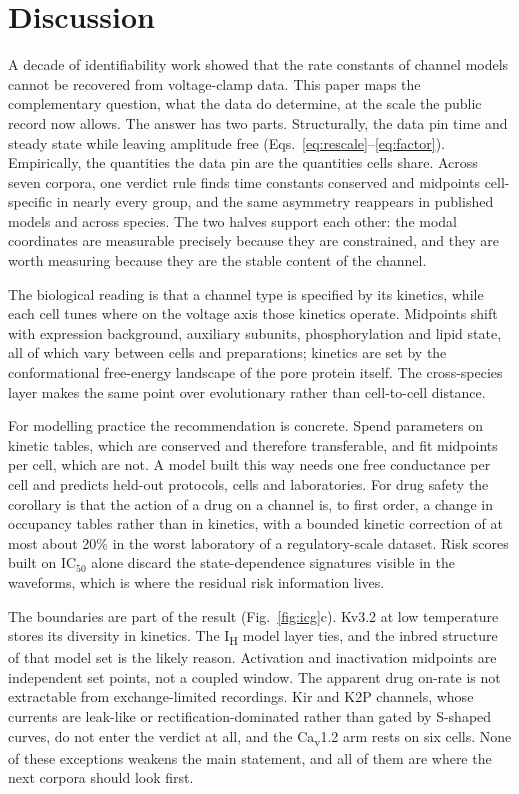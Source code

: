 \documentclass[11pt,a4paper]{article}
\begin{document}
\section{Discussion}

A decade of identifiability work showed that the rate constants of channel models
cannot be recovered from voltage-clamp data. This paper maps the complementary
question, what the data do determine, at the scale the public record now allows.
The answer has two parts. Structurally, the data pin time and steady state while
leaving amplitude free (Eqs.~\eqref{eq:rescale}--\eqref{eq:factor}).
Empirically, the quantities the data pin are the quantities cells share. Across
seven corpora, one verdict rule finds time constants conserved and midpoints
cell-specific in nearly every group, and the same asymmetry reappears in
published models and across species. The two halves support each other: the
modal coordinates are measurable precisely because they are constrained, and they
are worth measuring because they are the stable content of the channel.

The biological reading is that a channel type is specified by its kinetics, while
each cell tunes where on the voltage axis those kinetics operate. Midpoints shift
with expression background, auxiliary subunits, phosphorylation and lipid state,
all of which vary between cells and preparations; kinetics are set by the
conformational free-energy landscape of the pore protein itself. The cross-species
layer makes the same point over evolutionary rather than cell-to-cell distance.

For modelling practice the recommendation is concrete. Spend parameters on
kinetic tables, which are conserved and therefore transferable, and fit midpoints
per cell, which are not. A model built this way needs one free conductance per
cell and predicts held-out protocols, cells and laboratories. For drug safety the
corollary is that the action of a drug on a channel is, to first order, a change
in occupancy tables rather than in kinetics, with a bounded kinetic correction of
at most about 20\% in the worst laboratory of a regulatory-scale dataset. Risk
scores built on IC$_{50}$ alone discard the state-dependence signatures visible
in the waveforms, which is where the residual risk information lives.

The boundaries are part of the result (Fig.~\ref{fig:icg}c). Kv3.2 at low
temperature stores its diversity in kinetics. The I\textsubscript{H} model layer
ties, and the inbred structure of that model set is the likely reason.
Activation and inactivation midpoints are independent set points, not a coupled
window. The apparent drug on-rate is not extractable from exchange-limited
recordings. Kir and K2P channels, whose currents are leak-like or
rectification-dominated rather than gated by S-shaped curves, do not enter the
verdict at all, and the Ca\textsubscript{v}1.2 arm rests on six cells. None of
these exceptions weakens the main statement, and all of them are where the next
corpora should look first.
\end{document}
